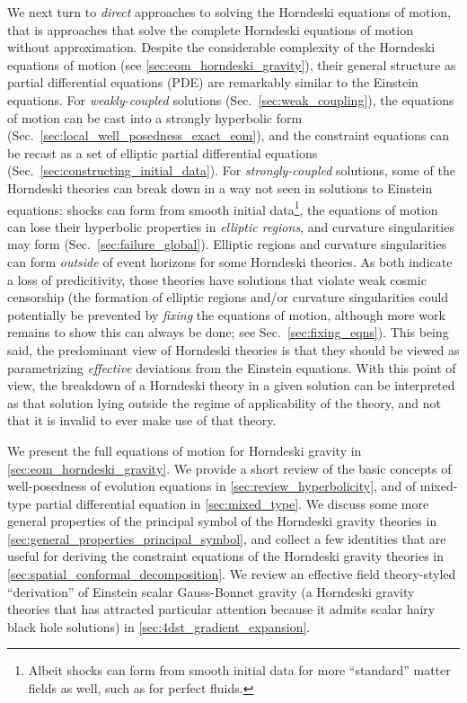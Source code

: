 \documentclass{ws-ijmpd}
\begin{document}
We next turn to \emph{direct} approaches to solving the Horndeski
equations of motion, that is approaches that solve the complete
Horndeski equations of motion without approximation.
Despite the considerable complexity of the Horndeski equations
of motion (see \ref{sec:eom_horndeski_gravity}), 
their general structure as partial differential equations (PDE) 
are remarkably similar to the Einstein 
equations\cite{Kovacs:2020pns,Kovacs:2020ywu,
Kovacs:2021lgk,Kovacs:2021vdk,Reall:2021voz}. 
For \emph{weakly-coupled} solutions (Sec.~\ref{sec:weak_coupling}),
the equations of motion can be cast
into a strongly hyperbolic form (Sec.~\ref{sec:local_well_posedness_exact_eom}),
and the constraint equations can be recast as a set of elliptic
partial differential equations (Sec.~\ref{sec:constructing_initial_data}).
For \emph{strongly-coupled} solutions, some of the Horndeski theories 
can break down in a way  
not seen in solutions to Einstein equations:
shocks can form from smooth initial data\footnote{Albeit shocks can 
form from smooth initial data 
for more ``standard'' matter fields as well, such
as for perfect fluids\cite{rezzolla2013relativistic}.},
the equations of motion can lose their hyperbolic properties 
in \emph{elliptic regions}, and curvature singularities
may form (Sec.~\ref{sec:failure_global}).
Elliptic regions and curvature singularities can form \emph{outside}
of event horizons for some Horndeski theories.
As both indicate a loss of predicitivity, those theories
have solutions that violate 
weak cosmic censorship\cite{Ripley:2019hxt,Ripley:2019irj,
Figueras:2020dzx,East:2021bqk} (the formation of elliptic
regions and/or curvature singularities 
could potentially be prevented by \emph{fixing} the equations
of motion, although more work remains to show this can always be done; 
see Sec.~\ref{sec:fixing_eqns}).
This being said, the predominant view of Horndeski theories is that they
should be viewed as parametrizing \emph{effective} deviations from
the Einstein equations. 
With this point of view, the breakdown of a Horndeski
theory in a given solution can be interpreted as that solution lying outside
the regime of applicability of the theory, 
and not that it is invalid to ever make use of that theory.

We present the full equations of motion for Horndeski gravity
in \ref{sec:eom_horndeski_gravity}. 
We provide a short review of the basic concepts of
well-posedness of evolution equations in
\ref{sec:review_hyperbolicity},
and of mixed-type partial differential equation in
\ref{sec:mixed_type}.
We discuss some more general properties
of the principal symbol of the Horndeski gravity theories
in \ref{sec:general_properties_principal_symbol}, and collect a few
identities that are useful for deriving the constraint equations of the
Horndeski gravity theories in \ref{sec:spatial_conformal_decomposition}.
We review an effective field
theory-styled ``derivation'' of Einstein scalar Gauss-Bonnet
gravity (a Horndeski gravity theories that has attracted particular
attention because it admits scalar hairy black hole solutions) in 
\ref{sec:4dst_gradient_expansion}.
\end{document}
